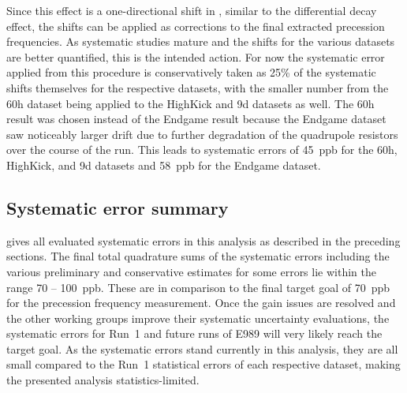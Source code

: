 Since this effect is a one-directional shift in \wa, similar to the differential decay effect, the shifts can be applied as corrections to the final extracted precession frequencies. As systematic studies mature and the shifts for the various datasets are better quantified, this is the intended action. For now the systematic error applied from this procedure is conservatively taken as 25\% of the systematic shifts themselves for the respective datasets, with the smaller number from the 60h dataset being applied to the HighKick and 9d datasets as well. The 60h result was chosen instead of the Endgame result because the Endgame dataset saw noticeably larger drift due to further degradation of the quadrupole resistors over the course of the run. This leads to systematic errors of \SI{45}{ppb} for the 60h, HighKick, and 9d datasets and \SI{58}{ppb} for the Endgame dataset.



\subsection{Systematic error summary}

 gives all evaluated systematic errors in this analysis as described in the preceding sections. The final total quadrature sums of the systematic errors including the various preliminary and conservative estimates for some errors lie within the range \SI{70}{} -- \SI{100}{ppb}. These are in comparison to the final target goal of \SI{70}{ppb} for the precession frequency measurement. Once the gain issues are resolved and the other working groups improve their systematic uncertainty evaluations, the systematic errors for Run~1 and future runs of E989 will very likely reach the target goal. As the systematic errors stand currently in this analysis, they are all small compared to the Run~1 statistical errors of each respective dataset, making the presented analysis statistics-limited. 



